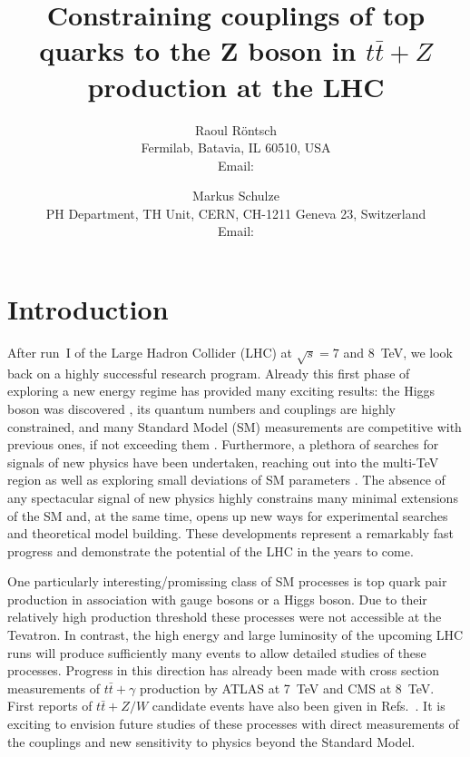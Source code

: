 \documentclass[preprint]{JHEP3} %
\title{Constraining couplings of top quarks to the Z boson in $t\bar{t}+Z$ production at the LHC}
\author{Raoul R\"ontsch \\ Fermilab, Batavia, IL 60510, USA \\
  Email: \email{rontsch@fnal.gov} }
\author{Markus Schulze \\ PH Department, TH Unit, CERN, CH-1211 Geneva 23, Switzerland \\
  Email: \email{markus.schulze@cern.ch} }
\def\ttb{t\bar{t}}
\begin{document}
\section{Introduction}
After run~I of the Large Hadron Collider (LHC) at $\sqrt{s}=7$ and 8~TeV, we look back on a highly successful research program.
Already this first phase of exploring a new energy regime has provided many exciting results: 
the Higgs boson was discovered \cite{}, its quantum numbers and couplings are highly constrained,
and many Standard Model (SM) measurements are competitive with previous ones, if not exceeding them \cite{}.
Furthermore, a plethora of searches for signals of new physics have been undertaken, reaching out into the multi-TeV region as well as
exploring small deviations of SM parameters \cite{}. 
The absence of any spectacular signal of new physics highly constrains many minimal extensions of the SM and, at the same time, 
opens up new ways for %
experimental searches and theoretical model building.
These developments represent a remarkably fast progress and demonstrate the potential of the LHC in the years to come.

One particularly interesting/promissing class of SM processes is top quark pair production in association with gauge bosons or a Higgs boson.
Due to their relatively high production threshold these processes were not accessible at the Tevatron. 
In contrast, the high energy and large luminosity of the upcoming LHC runs will produce sufficiently many events to allow detailed studies of these processes.
Progress in this direction has already been made with cross section measurements of $\ttb+\gamma$ production by ATLAS \cite{ATLAS-CONF-2011-153} at 7~TeV  
and CMS \cite{CMS-PAS-TOP-13-011} at 8~TeV. First reports of $\ttb+Z/W$ candidate events have also been given in Refs.~\cite{ATLAS-CONF-2012-126,Chatrchyan:2013qca}.
It is exciting to envision future studies of these processes with direct measurements of the couplings and new sensitivity to physics beyond the Standard Model. 
\end{document}
